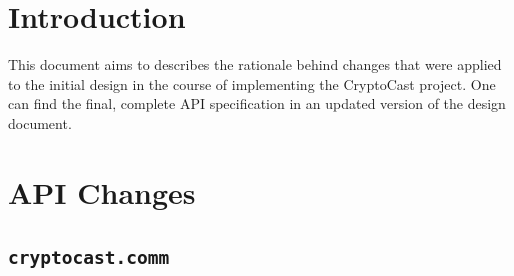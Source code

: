 \documentclass[a4paper,10pt]{scrartcl}
\title{\doctitle}
\author{\authorName}
\date{\today}
\begin{document}

\tableofcontents
\clearpage

\section{Introduction}
This document aims to describes the rationale behind changes that were applied to the initial design
in the course of implementing the CryptoCast project. One can find the final, complete API specification
in an updated version of the design document.

\section{API Changes}
\subsection{\lstinline|cryptocast.comm|}
\end{document}
